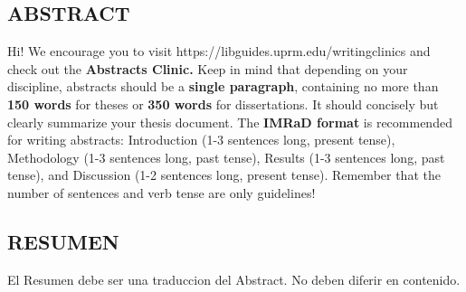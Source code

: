 



\vspace*{0.5in}
\begin{center}
	\section*{ABSTRACT}
\end{center}

\noindent
Hi! We encourage you to visit https://libguides.uprm.edu/writingclinics and check out the \textbf{Abstracts Clinic.} Keep in mind that depending on your discipline, abstracts should be a \textbf{single paragraph}, containing no more than \textbf{150 words} for theses or \textbf{350 words} for dissertations. It should concisely but clearly summarize your thesis document. The \textbf{IMRaD format} is recommended for writing abstracts: Introduction (1-3 sentences long, present tense), Methodology (1-3 sentences long, past tense), Results (1-3 sentences long, past tense), and Discussion (1-2 sentences long, present tense). Remember that the number of sentences and verb tense are only guidelines!







\newpage





\vspace*{0.5in}
\begin{center}
	\section*{RESUMEN}
\end{center}

\noindent
El Resumen debe ser una traduccion del Abstract. No deben diferir en contenido. %
